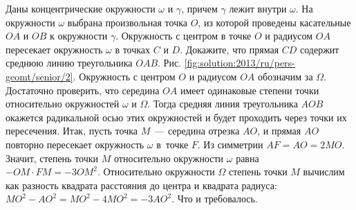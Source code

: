 \problem
Даны концентрические окружности $\omega$ и $\gamma$, причем $\gamma$ лежит
внутри $\omega$.
На окружности $\omega$ выбрана произвольная точка $O$, из которой проведены
касательные $OA$ и $OB$ к окружности $\gamma$.
Окружность с центром в точке $O$ и радиусом $OA$ пересекает окружность $\omega$
в точках $C$ и $D$.
Докажите, что прямая $CD$ содержит среднюю линию треугольника $OAB$.
%
\label{solution:2013/ru/pers-geomt/senior/2}
Рис. \ref{fig:solution:2013/ru/pers-geomt/senior/2}.
Окружность с центром $O$ и радиусом $OA$ обозначим за $\Omega$.
Достаточно проверить, что середина $OA$ имеет одинаковые степени точки
относительно окружностей $\omega$ и $\Omega$.
Тогда средняя линия треугольника $AOB$ окажется радикальной осью этих
окружностей и будет проходить через точки их пересечения.
Итак, пусть точка $M$~--- середина отрезка $AO$, и прямая $AO$ повторно
пересекает окружность $\omega$ в~точке $F$.
Из симметрии $AF = AO = 2 MO$.
Значит, степень точки $M$ относительно окружности $\omega$ равна
$- OM \cdot FM = - 3 OM^2$.
Относительно окружности $\Omega$ степень точки $M$ вычислим как разность
квадрата расстояния до центра и квадрата радиуса:
$MO^2 - AO^2 = MO^2 - 4 MO^2 = - 3 AO^2$.
Что и требовалось.
\endproblem

